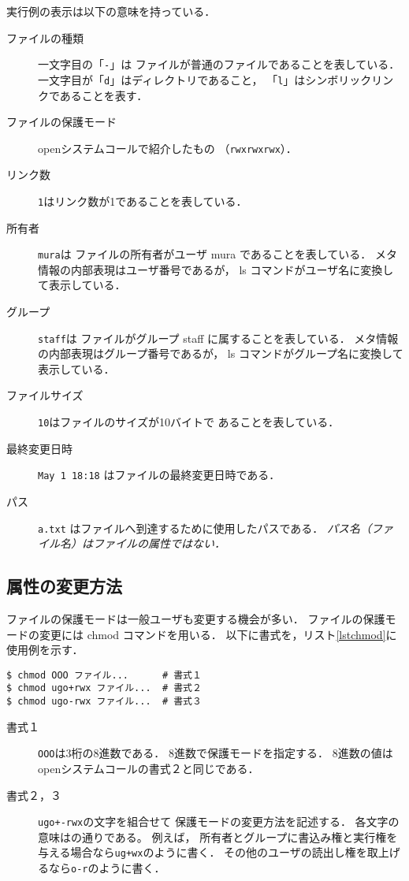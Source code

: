 実行例の表示は以下の意味を持っている．

\begin{description}
\item[ファイルの種類] 一文字目の「\texttt{-}」は
ファイルが普通のファイルであることを表している．
一文字目が「\texttt{d}」はディレクトリであること，
「\texttt{l}」はシンボリックリンクであることを表す．
\item[ファイルの保護モード] openシステムコールで紹介したもの
（\texttt{rwxrwxrwx}）．
\item[リンク数] \texttt{1}はリンク数が1であることを表している．
\item[所有者] \texttt{mura}は
ファイルの所有者がユーザ mura であることを表している．
メタ情報の内部表現はユーザ番号であるが，
ls コマンドがユーザ名に変換して表示している．
\item[グループ] \texttt{staff}は
ファイルがグループ staff に属することを表している．
メタ情報の内部表現はグループ番号であるが，
ls コマンドがグループ名に変換して表示している．
\item[ファイルサイズ] \texttt{10}はファイルのサイズが10バイトで
あることを表している．
\item[最終変更日時] \texttt{May 1 18:18} はファイルの最終変更日時である．
\item[パス] \texttt{a.txt} はファイルへ到達するために使用したパスである．
\emph{パス名（ファイル名）はファイルの属性ではない．}
\end{description}

\subsection{属性の変更方法}
ファイルの保護モードは一般ユーザも変更する機会が多い．
ファイルの保護モードの変更には chmod コマンドを用いる．
以下に書式を，リスト\ref{lstchmod}に使用例を示す．

\begin{lstlisting}[numbers=none]
$ chmod OOO ファイル...      # 書式１
$ chmod ugo+rwx ファイル...  # 書式２
$ chmod ugo-rwx ファイル...  # 書式３
\end{lstlisting}

\begin{description}
\item[書式１] \texttt{OOO}は3桁の8進数である．
8進数で保護モードを指定する．
8進数の値はopenシステムコールの書式２と同じである．

\item[書式２，３] \texttt{ugo+-rwx}の文字を組合せて
保護モードの変更方法を記述する．
各文字の意味はの通りである。
例えば，
所有者とグループに書込み権と実行権を与える場合なら\texttt{ug+wx}のように書く．
その他のユーザの読出し権を取上げるなら\texttt{o-r}のように書く．
\end{description}

